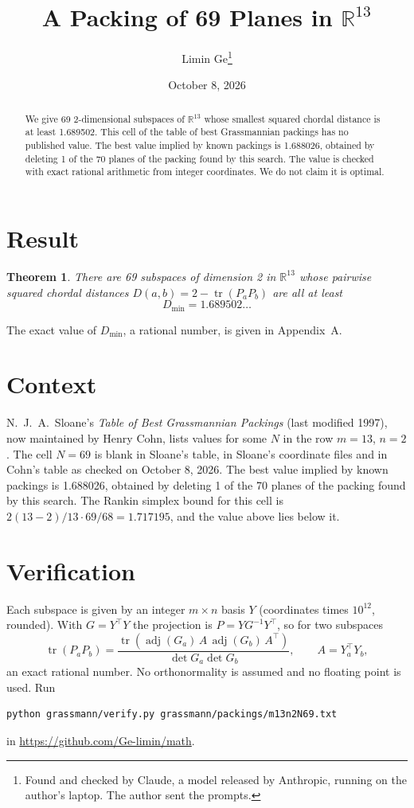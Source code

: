 \documentclass[11pt,a4paper]{article}
\title{A Packing of 69 Planes in $\mathbb{R}^{13}$}
\author{Limin Ge\thanks{Found and checked by Claude, a model released by Anthropic, running on the author's laptop. The author sent the prompts.}}
\date{October 8, 2026}
\newtheorem*{theorem}{Theorem}
\begin{document}
\maketitle
\begin{abstract}
We give 69 2-dimensional subspaces of $\mathbb{R}^{13}$ whose smallest squared chordal distance is at least 1.689502. This cell of the table of best Grassmannian packings has no published value. The best value implied by known packings is 1.688026, obtained by deleting 1 of the 70 planes of the packing found by this search. The value is checked with exact rational arithmetic from integer coordinates. We do not claim it is optimal.
\end{abstract}

\section{Result}
\begin{theorem}
There are 69 subspaces of dimension 2 in $\mathbb{R}^{13}$ whose pairwise squared chordal distances $D(a,b) = 2 - \operatorname{tr}(P_aP_b)$ are all at least
\[ D_{\min} = 1.689502\ldots \]
\end{theorem}
The exact value of $D_{\min}$, a rational number, is given in Appendix~A.


\section{Context}
N.~J.~A.~Sloane's \emph{Table of Best Grassmannian Packings} (last modified 1997), now maintained by Henry Cohn, lists values for some $N$ in the row $m=13$, $n=2$. The cell $N=69$ is blank in Sloane's table, in Sloane's coordinate files and in Cohn's table as checked on October 8, 2026. The best value implied by known packings is 1.688026, obtained by deleting 1 of the 70 planes of the packing found by this search. The Rankin simplex bound for this cell is $2(13-2)/13\cdot 69/68 = 1.717195$, and the value above lies below it.


\section{Verification}
Each subspace is given by an integer $m\times n$ basis $Y$ (coordinates times $10^{12}$, rounded). With $G=Y^\top Y$ the projection is $P=YG^{-1}Y^\top$, so for two subspaces
\[ \operatorname{tr}(P_aP_b)=\frac{\operatorname{tr}(\operatorname{adj}(G_a)\,A\,\operatorname{adj}(G_b)\,A^\top)}{\det G_a\det G_b},\qquad A=Y_a^\top Y_b, \]
an exact rational number. No orthonormality is assumed and no floating point is used. Run
\begin{verbatim}
python grassmann/verify.py grassmann/packings/m13n2N69.txt
\end{verbatim}
in \url{https://github.com/Ge-limin/math}.
\end{document}
